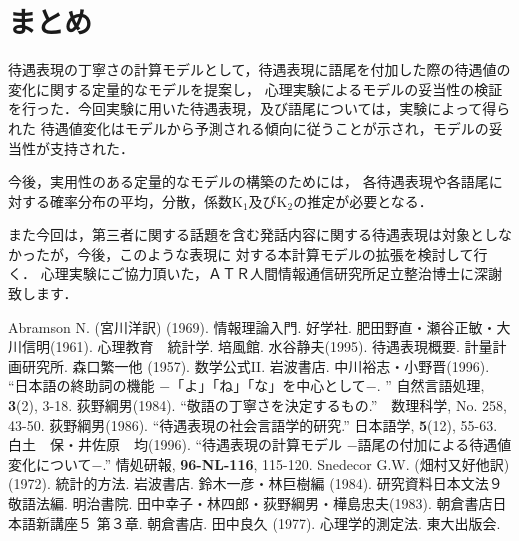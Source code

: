 \section{まとめ}
待遇表現の丁寧さの計算モデルとして，待遇表現に語尾を付加した際の待遇値の変化に関する定量的なモデルを提案し，
心理実験によるモデルの妥当性の検証を行った．今回実験に用いた待遇表現，及び語尾については，実験によって得られた
待遇値変化はモデルから予測される傾向に従うことが示され，モデルの妥当性が支持された．

今後，実用性のある定量的なモデルの構築のためには，
各待遇表現や各語尾に対する確率分布の平均，分散，係数K\(_{1}\)及びK\(_{2}\)の推定が必要となる．

また今回は，第三者に関する話題を含む発話内容に関する待遇表現は対象としなかったが，今後，このような表現に
対する本計算モデルの拡張を検討して行く．
\acknowledgment
心理実験にご協力頂いた，ＡＴＲ人間情報通信研究所足立整治博士に深謝致します．
\vspace*{-1mm}
\begin{thebibliography}{99}
\vspace*{-2mm}
\bibitem{}Abramson N. (宮川洋訳) (1969). 情報理論入門. 好学社.
\bibitem{}肥田野直・瀬谷正敏・大川信明(1961). 心理教育　統計学. 培風館.
\bibitem{}水谷静夫(1995). 待遇表現概要. 計量計画研究所.
\bibitem{}森口繁一他 (1957). 数学公式II. 岩波書店.
\bibitem{}中川裕志・小野晋(1996). ``日本語の終助詞の機能 −「よ」「ね」「な」を中心として−. '' 自然言語処理, 
{\bf 3}(2), 3-18.
\bibitem{}荻野綱男(1984). ``敬語の丁寧さを決定するもの.''　数理科学, No. 258, 43-50.
\bibitem{}荻野綱男(1986). ``待遇表現の社会言語学的研究.'' 日本語学, {\bf 5}(12), 55-63.
\bibitem{}白土　保・井佐原　均(1996). ``待遇表現の計算モデル −語尾の付加による待遇値変化について−.'' 
 情処研報, {\bf 96-NL-116}, 115-120.
\bibitem{}Snedecor G.W. (畑村又好他訳) (1972). 統計的方法. 岩波書店.
\bibitem{}鈴木一彦・林巨樹編 (1984). 研究資料日本文法９ 敬語法編. 明治書院.
\bibitem{}田中幸子・林四郎・荻野綱男・樺島忠夫(1983). 朝倉書店日本語新講座５ 第３章. 朝倉書店.
\bibitem{}田中良久 (1977). 心理学的測定法. 東大出版会.
\end{thebibliography}
\vspace*{-1mm}
\begin{biography}
\end{biography}

